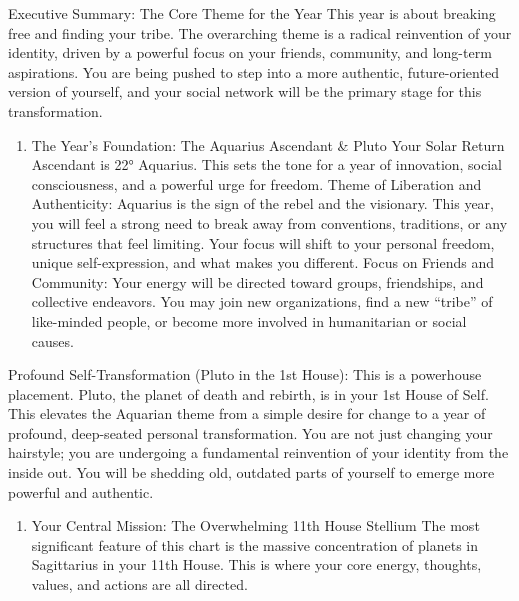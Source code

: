 \documentclass{article}
\begin{document}
Executive Summary: The Core Theme for the Year This year is about
breaking free and finding your tribe. The overarching theme is a radical
reinvention of your identity, driven by a powerful focus on your
friends, community, and long-term aspirations. You are being pushed to
step into a more authentic, future-oriented version of yourself, and
your social network will be the primary stage for this transformation.

\begin{enumerate}
\def\labelenumi{\arabic{enumi}.}
\tightlist
\item
  The Year's Foundation: The Aquarius Ascendant \& Pluto Your Solar
  Return Ascendant is 22° Aquarius. This sets the tone for a year of
  innovation, social consciousness, and a powerful urge for freedom.
  Theme of Liberation and Authenticity: Aquarius is the sign of the
  rebel and the visionary. This year, you will feel a strong need to
  break away from conventions, traditions, or any structures that feel
  limiting. Your focus will shift to your personal freedom, unique
  self-expression, and what makes you different. Focus on Friends and
  Community: Your energy will be directed toward groups, friendships,
  and collective endeavors. You may join new organizations, find a new
  ``tribe'' of like-minded people, or become more involved in
  humanitarian or social causes.
\end{enumerate}

Profound Self-Transformation (Pluto in the 1st House): This is a
powerhouse placement. Pluto, the planet of death and rebirth, is in your
1st House of Self. This elevates the Aquarian theme from a simple desire
for change to a year of profound, deep-seated personal transformation.
You are not just changing your hairstyle; you are undergoing a
fundamental reinvention of your identity from the inside out. You will
be shedding old, outdated parts of yourself to emerge more powerful and
authentic.

\begin{enumerate}
\def\labelenumi{\arabic{enumi}.}
\setcounter{enumi}{1}
\tightlist
\item
  Your Central Mission: The Overwhelming 11th House Stellium The most
  significant feature of this chart is the massive concentration of
  planets in Sagittarius in your 11th House. This is where your core
  energy, thoughts, values, and actions are all directed.
\end{enumerate}
\end{document}
